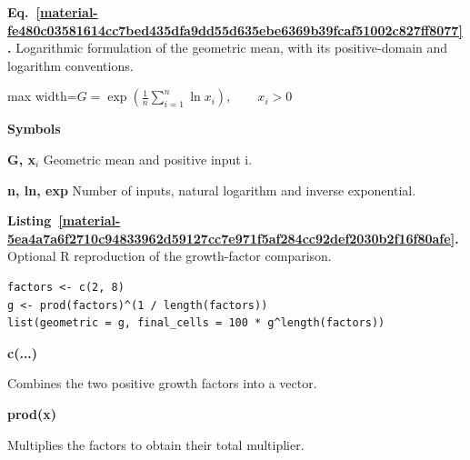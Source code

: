 \documentclass[11pt,a4paper]{article}
\newcounter{listing}
\begin{document}
\par\medskip
\noindent\begin{minipage}{\linewidth}
\label{material-fe480c03581614cc7bed435dfa9dd55d635ebe6369b39fcaf51002c827ff8077}
\noindent\textbf{Eq.~\ref*{material-fe480c03581614cc7bed435dfa9dd55d635ebe6369b39fcaf51002c827ff8077}.} Logarithmic formulation of the geometric mean, with its positive-domain and logarithm conventions.\par\nopagebreak
\begin{center}\begin{adjustbox}{max width=\linewidth}$\displaystyle G = \exp\left(\frac{1}{n}\sum_{i=1}^{n}\ln x_i\right), \qquad x_i > 0$\end{adjustbox}\end{center}

\par\noindent\textbf{Symbols}

\par\noindent\textbf{G, x\ensuremath{{}_i}} Geometric mean and positive input i.

\par\noindent\textbf{n, ln, exp} Number of inputs, natural logarithm and inverse exponential.

\end{minipage}\par
\medskip

\par\medskip
{}
\label{material-5ea4a7a6f2710c94833962d59127cc7e971f5af284cc92def2030b2f16f80afe}
\noindent\textbf{Listing~\ref*{material-5ea4a7a6f2710c94833962d59127cc7e971f5af284cc92def2030b2f16f80afe}.} Optional R reproduction of the growth-factor comparison.\par\nopagebreak
\begin{Verbatim}[fontsize=\footnotesize,breaklines=true,breakanywhere=true]
factors <- c(2, 8)
g <- prod(factors)^(1 / length(factors))
list(geometric = g, final_cells = 100 * g^length(factors))
\end{Verbatim}

\par\noindent\textbf{c(...)}

Combines the two positive growth factors into a vector.

\par\noindent\textbf{prod(x)}

Multiplies the factors to obtain their total multiplier.
\end{document}

